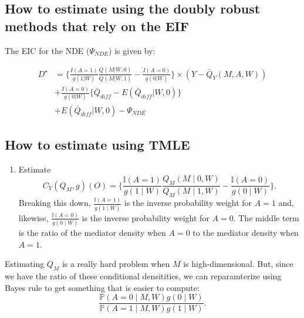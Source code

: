 \documentclass[
  12pt,
]{book}
\providecommand{\tightlist}{%
  \setlength{\itemsep}{0pt}\setlength{\parskip}{0pt}}
\theoremstyle{definition}
\theoremstyle{definition}
\theoremstyle{definition}
\renewcommand{\P}{\mathbb{P}}
\newcommand{\I}{\mathbb{I}}
\newcommand{\1}{\mathbbm{1}}
\begin{document}
\hypertarget{how-to-estimate-using-the-doubly-robust-methods-that-rely-on-the-eif}{%
\subsection{How to estimate using the doubly robust methods that rely on the EIF}\label{how-to-estimate-using-the-doubly-robust-methods-that-rely-on-the-eif}}

The EIC for the NDE (\(\Psi_{NDE}\)) is given by:

\begin{align}
    D^{\star} &= \bigg\{ \frac{I(A=1)}{g(1|W)}\frac{Q(M|W,0)}{Q(M|W,1)} -
      \frac{I(A=0)}{g(0|W)}\bigg\} \times (Y-\bar{Q}_Y(M,A,W))  \\
    &+ \frac{I(A=0)}{g(0|W)}\{ \bar{Q}_{diff} - E(\bar{Q}_{diff} | W,0) \}\\
    &+ E(\bar{Q}_{diff} | W,0) - \Psi_{NDE}
\end{align}

\hypertarget{how-to-estimate-using-tmle}{%
\subsection{How to estimate using TMLE}\label{how-to-estimate-using-tmle}}

\begin{enumerate}
\def\labelenumi{\arabic{enumi}.}
\tightlist
\item
  Estimate
  \begin{equation*}
   C_Y(Q_M, g)(O) = \Bigg\{\frac{\I(A = 1)}{g(1 \mid W)}
     \frac{Q_M(M \mid 0, W)}{Q_M(M \mid 1, W)} -
     \frac{\I(A = 0)}{g(0 \mid W)} \Bigg\}.
    \end{equation*}
  Breaking this down, \(\frac{\I(A = 1)}{g(1 \mid W)}\) is the inverse probability
  weight for \(A = 1\) and, likewise, \(\frac{\I(A = 0)}{g(0 \mid W)}\) is the inverse
  probability weight for \(A = 0\). The middle term is the ratio of the mediator
  density when \(A = 0\) to the mediator density when \(A = 1\).
\end{enumerate}

Estimating \(Q_M\) is a really hard problem when \(M\) is high-dimensional. But,
since we have the ratio of these conditional densitities, we can reparamterize
using Bayes rule to get something that is easier to compute:
\begin{equation*}
  \frac{\P(A = 0 \mid M, W) g(0 \mid W)}{\P(A = 1 \mid M, W) g(1 \mid W)}.
\end{equation*}
\end{document}
